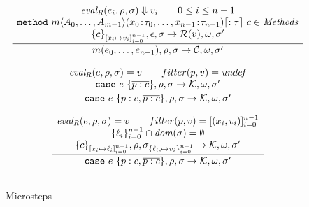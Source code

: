 \documentclass[12pt]{article}
\def\env{\rho}
\def\heap{\sigma}
\def\continue{{\mathcal{C}}}
\def\ret{{\mathcal{R}}}
\def\dom{{\mathit{dom}}}
\newcommand{\evalRight}[3]{{\mathit{eval_R}}(#1,#2,#3)}
\newcommand{\field}[2]{#1\!:\!#2}
\begin{document}
 \begin{figure}
  $$
  \begin{array}{c}
  \cfrac{
    \begin{array}{c}
    \evalRight{e_i}{\env}{\heap} \Downarrow v_i \qquad 0\leq i \leq n-1 \\
    {\tt{method}}~m\langle A_0,\ldots,A_{m-1}\rangle(\field{x_0}{\tau_0},\ldots,\field{x_{n-1}}{\tau_{n-1}})\lceil :\tau\rceil~c \in {\mathit{Methods}}\\
    \{c\}_{[x_i \mapsto v_i]_{i=0}^{n-1}},\epsilon, \heap \rightarrow \ret(v), \omega, \heap'
    \end{array}
  }{
  m(e_0,\ldots,e_{n-1}), \env, \heap \rightarrow \continue, \omega, \heap'
  }
  \\\\
  \cfrac{ 
    \begin{array}{c}
    \evalRight{e}{\env}{\heap} = v \qquad
    filter(p,v) = {\mathit{undef}} \\
    {\tt{case}}~e~\{\overline{p:c}\}, \env ,\heap \rightarrow \mathcal{K},\omega, \heap'
    \end{array}
  }{
    {\tt{case}}~e~\{p:c,\overline{p:c}\}, \env ,\heap \rightarrow \mathcal{K},\omega, \heap'
  }
  \\\\
  \cfrac{ 
    \begin{array}{c}
    \evalRight{e}{\env}{\heap} = v \qquad
    filter(p,v) = [(x_i,v_i)]_{i=0}^{n-1}\\
    \{\ell_i\}_{i=0}^{n-1} \cap \dom(\heap)= \emptyset \\
    \{c\}_{[x_i \mapsto \ell_i]_{i=0}^{n-1}}, \env, \heap_{\{\ell_i, \mapsto v_i\}_{i=0}^{n-1}} 
    \rightarrow \mathcal{K},\omega,\heap'
    \end{array}
  }{
    {\tt{case}}~e~\{p:c,\overline{p:c}\}, \env ,\heap \rightarrow \mathcal{K}, \omega , \heap'
  }
  \\\\
\end{array}
$$
\caption{Microsteps}
\label{fig:sem2}
\end{figure}
\end{document}
